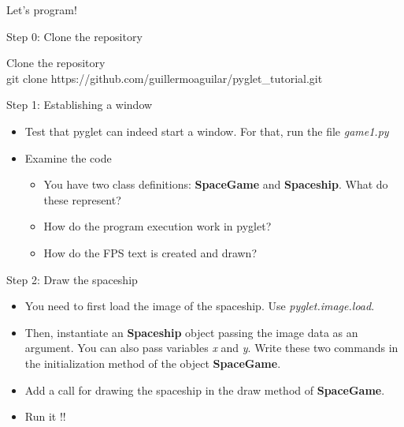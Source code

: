 \documentclass[10pt]{beamer}
\begin{document}
\begin{frame}{}
\center
\Huge{Let's program!}


\end{frame}

\begin{frame}{Step 0: Clone the repository}

Clone the repository\\[10pt]

git clone https://github.com/guillermoaguilar/pyglet\_tutorial.git

\end{frame}

\begin{frame}{Step 1: Establishing a window}
\center

\begin{itemize}
\item Test that pyglet can indeed start a window. For that, run the file \textit{game1.py} 

\item Examine the code
\begin{itemize}

\item You have two class definitions: \textbf{SpaceGame} and \textbf{Spaceship}. What do these represent? 

\item How do the program execution work in pyglet?

\item How do the FPS text is created and drawn? 
\end{itemize}

\end{itemize}
\end{frame}

\begin{frame}{Step 2: Draw the spaceship}

\begin{itemize}

\item You need to first load the image of the spaceship. Use \textsl{pyglet.image.load}.
\item Then, instantiate an \textbf{Spaceship} object passing the image data as an argument. You can also pass variables \textit{x} and \textit{y}.
Write these two commands in the initialization method of the object \textbf{SpaceGame}.
\item Add a call for drawing the spaceship in the draw method of \textbf{SpaceGame}.
\item Run it !!

\end{itemize}
\end{frame}
\end{document}
